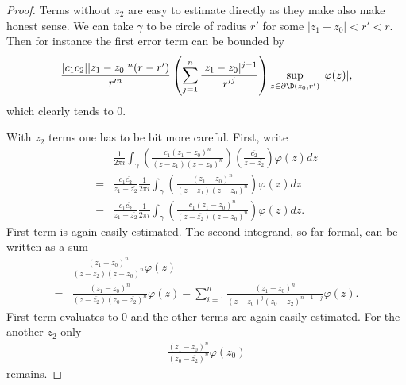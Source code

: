 \begin{proof}
	Terms without $z_{2}$ are easy to estimate directly as they make also make honest sense. We can take $\gamma$ to be circle of radius $r'$ for some $|z_{1} - z_{0}| < r' < r$. Then for instance the first error term can be bounded by
	\begin{align*}
		\frac{|c_{1} c_{2}| |z_{1} - z_{0}|^{n}(r - r')}{r'^{n}} \left(\sum_{j = 1}^{n} \frac{|z_{1} - z_{0}|^{j - 1}}{{r'}^{j}}\right) \sup_{z \in \partial \D(z_{0}, r')}|\varphi(z)|,
	\end{align*}
	which clearly tends to $0$.

	With $z_{2}$ terms one has to be bit more careful. First, write
	\begin{align*}
		& \frac{1}{2 \pi i}\int_{\gamma} \left(\frac{c_{1}(z_{1} - z_{0})^{n}}{(z - z_{1})(z - z_{0})^{n}}\right) \left(\frac{\overline{c_{2}}}{z - \overline{z_{2}}} \right) \varphi(z) dz \\
		= & \frac{c_{1} \overline{c_{2}}}{z_{1} - \overline{z_{2}}}\frac{1}{2 \pi i}\int_{\gamma} \left(\frac{(z_{1} - z_{0})^{n}}{(z - z_{1})(z - z_{0})^{n}}\right) \varphi(z) dz \\
		-& \frac{c_{1} \overline{c_{2}}}{z_{1} - \overline{z_{2}}}\frac{1}{2 \pi i}\int_{\gamma} \left(\frac{c_{1}(z_{1} - z_{0})^{n}}{(z - \overline{z_{2}})(z - z_{0})^{n}}\right) \varphi(z) dz.
	\end{align*}
	First term is again easily estimated. The second integrand, so far formal, can be written as a sum
	\begin{align*}
		& \frac{(z_{1} - z_{0})^{n}}{(z - \overline{z_{2}})(z - z_{0})^{n}} \varphi(z)\\
		=& \frac{(z_{1} - z_{0})^{n}}{(z - \overline{z_{2}})(z_{0} - \overline{z_{2}})^{n}}\varphi(z) - \sum_{i = 1}^{n} \frac{(z_{1} - z_{0})^{n}}{(z - z_{0})^{j} (z_{0} - \overline{z_{2}})^{n + 1 - j}}\varphi(z).
	\end{align*}
	First term evaluates to $0$ and the other terms are again easily estimated. For the another $z_{2}$ only
	\begin{align*}
		\frac{(z_{1} - z_{0})^{n}}{(z_{0} - \overline{z_{2}})^{n}} \varphi(z_{0})
	\end{align*}
	remains.


\end{proof}
